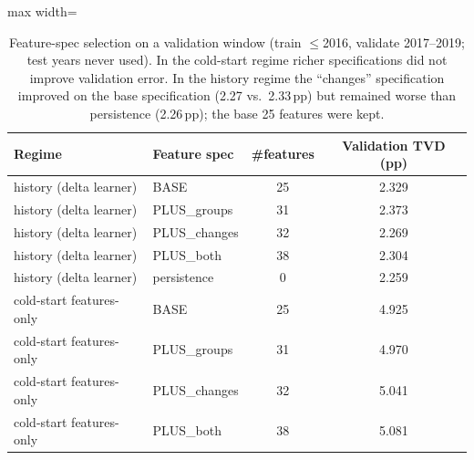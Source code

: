 \begin{table}[H]
\caption{Feature-spec selection on a validation window (train $\le$2016, validate 2017--2019; test years never used). In the cold-start regime richer specifications did not improve validation error. In the history regime the ``changes'' specification improved on the base specification (2.27 vs.\ 2.33\,pp) but remained worse than persistence (2.26\,pp); the base 25 features were kept.}\label{tab:selection}
\centering\footnotesize
\renewcommand{\arraystretch}{1.0}
\begin{adjustbox}{max width=\linewidth}
\begin{tabular}{llcc}
\toprule
Regime & Feature spec & \#features & Validation TVD (pp) \\
\midrule
history (delta learner) & BASE & 25 & 2.329 \\
history (delta learner) & PLUS\_groups & 31 & 2.373 \\
history (delta learner) & PLUS\_changes & 32 & 2.269 \\
history (delta learner) & PLUS\_both & 38 & 2.304 \\
history (delta learner) & persistence & 0 & 2.259 \\
cold-start features-only & BASE & 25 & 4.925 \\
cold-start features-only & PLUS\_groups & 31 & 4.970 \\
cold-start features-only & PLUS\_changes & 32 & 5.041 \\
cold-start features-only & PLUS\_both & 38 & 5.081 \\
\bottomrule
\end{tabular}\end{adjustbox}
\end{table}
